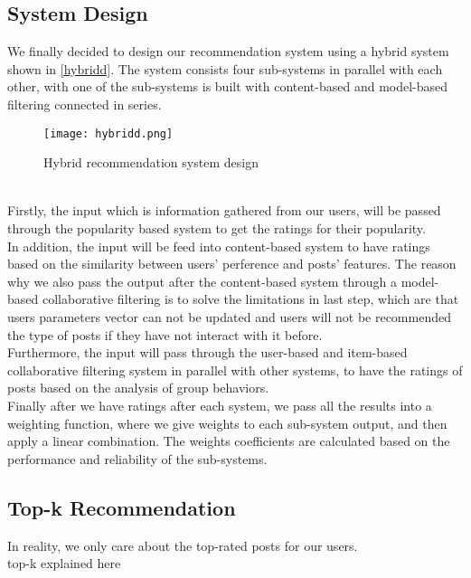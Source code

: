 \subsection{System Design}
We finally decided to design our recommendation system using a hybrid system shown in \autoref{hybridd}. The system consists four sub-systems in parallel with each other, 
with one of the sub-systems is built with content-based and model-based filtering connected in series.
\begin{figure}[ht]
    \centering
    \texttt{[image: hybridd.png]}
    \caption{Hybrid recommendation system design}
    \label{hybridd}
    \end{figure}
\\Firstly, the input which is information gathered from our users, will be passed through the popularity based system to get the ratings for their popularity.
\\In addition, the input will be feed into content-based system to have ratings based on the similarity between users' perference and posts' features. 
The reason why we also pass the output after the content-based system through a model-based collaborative filtering is to solve the limitations in last step, 
which are that users parameters vector can not be updated and users will not be recommended the type of posts if they have not interact with it before.
\\Furthermore, the input will pass through the user-based and item-based collaborative filtering system in parallel with other systems, 
to have the ratings of posts based on the analysis of group behaviors.
\\Finally after we have ratings after each system, we pass all the results into a weighting function, where we give weights to each sub-system output, and then apply a linear combination.
The weights coefficients are calculated based on the performance and reliability of the sub-systems.

\subsection{Top-k Recommendation}
\label{Top-k Recommendation}
In reality, we only care about the top-rated posts for our users. 
\\top-k explained here




